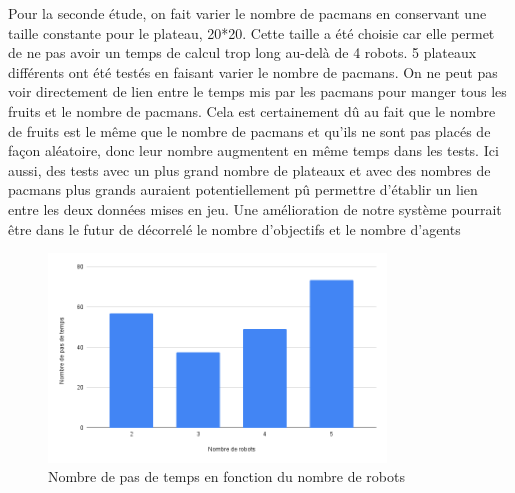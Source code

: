 Pour la seconde étude, on fait varier le nombre de pacmans en conservant une taille constante pour le plateau, 20*20. Cette taille a été choisie car elle permet de ne pas avoir un temps de calcul trop long au-delà de 4 robots. 5 plateaux différents ont été testés en faisant varier le nombre de pacmans. On ne peut pas voir directement de lien entre le temps mis par les pacmans pour manger tous les fruits et le nombre de pacmans. Cela est certainement dû au fait que le nombre de fruits est le même que le nombre de pacmans et qu'ils ne sont pas placés de façon aléatoire, donc leur nombre augmentent en même temps dans les tests. Ici aussi, des tests avec un plus grand nombre de plateaux et avec des nombres de pacmans plus grands auraient potentiellement pû permettre d’établir un lien entre les deux données mises en jeu. Une amélioration de notre système pourrait être dans le futur de décorrelé le nombre d'objectifs et le nombre d'agents
\begin{figure}[H]
	\centering
	\includegraphics[width=0.8\textwidth]{image/resultat2}
	\caption{Nombre de pas de temps en fonction du nombre de robots}
\end{figure}
